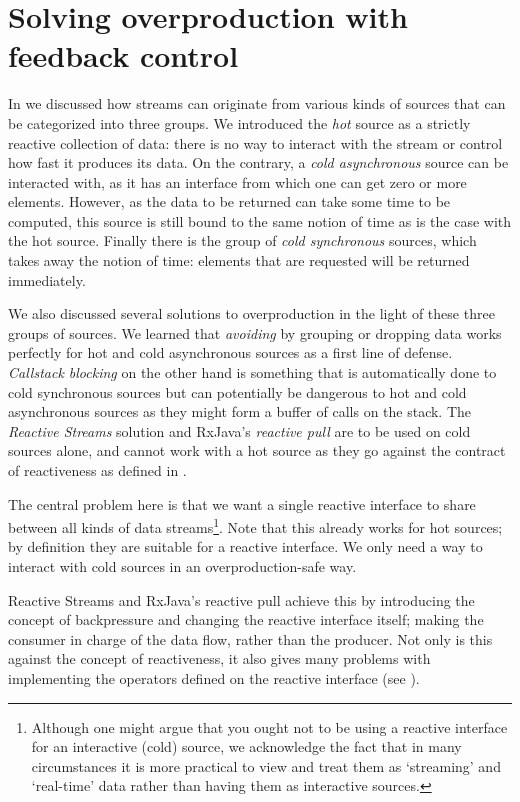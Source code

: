 \chapter{Solving overproduction with feedback control}
\label{chap:solving-overproduction}

In  we discussed how streams can originate from various kinds of sources that can be categorized into three groups. We introduced the \textit{hot} source as a strictly reactive collection of data: there is no way to interact with the stream or control how fast it produces its data. On the contrary, a \textit{cold asynchronous} source can be interacted with, as it has an interface from which one can get zero or more elements. However, as the data to be returned can take some time to be computed, this source is still bound to the same notion of time as is the case with the hot source. Finally there is the group of \textit{cold synchronous} sources, which takes away the notion of time: elements that are requested will be returned immediately.

We also discussed several solutions to overproduction in the light of these three groups of sources. We learned that \textit{avoiding} by grouping or dropping data works perfectly for hot and cold asynchronous sources as a first line of defense. \textit{Callstack blocking} on the other hand is something that is automatically done to cold synchronous sources but can potentially be dangerous to hot and cold asynchronous sources as they might form a buffer of calls on the stack. The \textit{Reactive Streams} solution and RxJava's \textit{reactive pull} are to be used on cold sources alone, and cannot work with a hot source as they go against the contract of reactiveness as defined in \cite{berry1991-Reactive}.

The central problem here is that we want a single reactive interface to share between all kinds of data streams\footnote{Although one might argue that you ought not to be using a reactive interface for an interactive (cold) source, we acknowledge the fact that in many circumstances it is more practical to view and treat them as `streaming' and `real-time' data rather than having them as interactive sources.}. Note that this already works for hot sources; by definition they are suitable for a reactive interface. We only need a way to interact with cold sources in an overproduction-safe way.

Reactive Streams and RxJava's reactive pull achieve this by introducing the concept of backpressure and changing the reactive interface itself; making the consumer in charge of the data flow, rather than the producer. Not only is this against the concept of reactiveness, it also gives many problems with implementing the operators defined on the reactive interface (see ).


